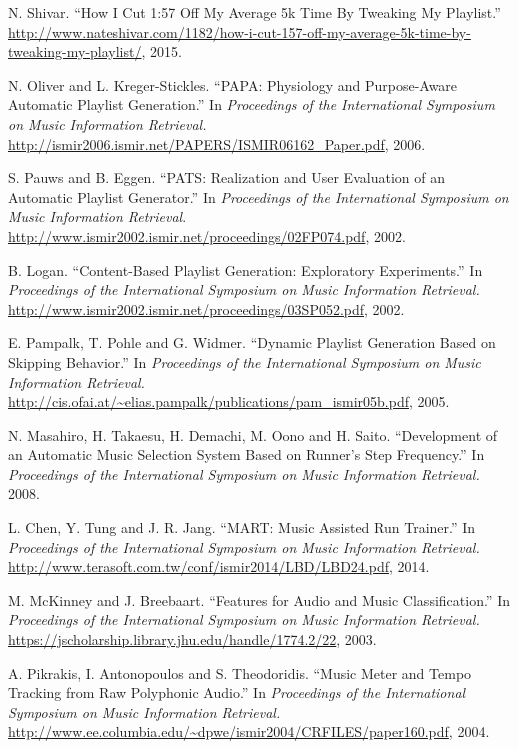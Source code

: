 \documentclass{article}
\begin{document}
\begin{thebibliography}{cites}
\raggedright
{}
N. Shivar. ``How I Cut 1:57 Off My Average 5k Time By Tweaking My Playlist.'' \url{http://www.nateshivar.com/1182/how-i-cut-157-off-my-average-5k-time-by-tweaking-my-playlist/}, 2015.

N. Oliver and L. Kreger-Stickles. ``PAPA: Physiology and Purpose-­Aware Automatic Playlist Generation.'' In {\it Proceedings of the International Symposium on Music Information Retrieval.} \url{http://ismir2006.ismir.net/PAPERS/ISMIR06162_Paper.pdf}, 2006.

S. Pauws and B. Eggen. ``PATS: Realization and User Evaluation of an Automatic Playlist Generator.'' In {\it Proceedings of the International Symposium on Music Information Retrieval}. \url{http://www.ismir2002.ismir.net/proceedings/02FP074.pdf}, 2002.

B. Logan. ``Content-­Based Playlist Generation: Exploratory Experiments.'' In {\it Proceedings of the International Symposium on Music Information Retrieval.} \url{http://www.ismir2002.ismir.net/proceedings/03SP052.pdf}, 2002.

E. Pampalk, T. Pohle and G. Widmer. ``Dynamic Playlist Generation Based on Skipping Behavior.'' In {\it Proceedings of the International Symposium on Music Information Retrieval.} \url{http://cis.ofai.at/~elias.pampalk/publications/pam_ismir05b.pdf}, 2005.

N. Masahiro, H. Takaesu, H. Demachi, M. Oono and H. Saito. ``Development of an Automatic Music Selection System Based on Runner’s Step Frequency.'' In {\it Proceedings of the International Symposium on Music Information Retrieval.} 2008.

L. Chen, Y. Tung and J. R. Jang. ``MART: Music Assisted Run Trainer.'' In {\it Proceedings of the International Symposium on Music Information Retrieval.} \url{http://www.terasoft.com.tw/conf/ismir2014/LBD/LBD24.pdf}, 2014.

M. McKinney and J. Breebaart. ``Features for Audio and Music Classification.'' In {\it Proceedings of the International Symposium on Music Information Retrieval.} \url{https://jscholarship.library.jhu.edu/handle/1774.2/22}, 2003.

A. Pikrakis, I. Antonopoulos and S. Theodoridis. ``Music Meter and Tempo Tracking from Raw Polyphonic Audio.'' In {\it Proceedings of the International Symposium on Music Information Retrieval.} \url{http://www.ee.columbia.edu/~dpwe/ismir2004/CRFILES/paper160.pdf}, 2004.


\end{thebibliography}
\end{document}
